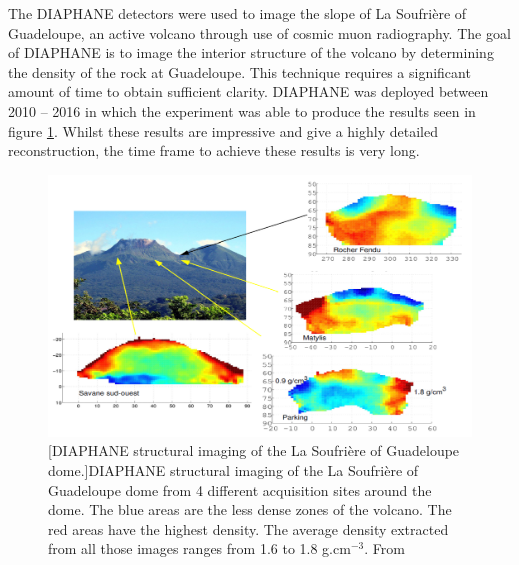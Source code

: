 The DIAPHANE detectors were used to image the slope of La Soufrière of Guadeloupe, an active volcano through use of cosmic muon radiography. The goal of DIAPHANE is to image the interior structure of the volcano by determining the density of the rock at Guadeloupe. This technique requires a significant amount of time to obtain sufficient clarity. DIAPHANE was deployed between 2010 -- 2016 in which the experiment was able to produce the results seen in figure \ref{fig:diaphaneStructualImaging}. Whilst these results are impressive and give a highly detailed reconstruction, the time frame to achieve these results is very long. 

\begin{figure}[!h]
 \centering
 \includegraphics[width=1.0\linewidth]{Chapter5/Figs/Raster/diaphane_structuralImaging.png}
 [DIAPHANE structural imaging of the La Soufrière of Guadeloupe dome.]{DIAPHANE structural imaging of the La Soufrière of Guadeloupe dome from 4 different acquisition sites around the dome. The blue areas are the less dense zones of the volcano. The red areas have the highest density. The average density extracted from all those images ranges from 1.6 to 1.8 g.cm$^{-3}$. From \cite{Marteau_2017}} 
 \label{fig:diaphaneStructualImaging}
\end{figure}

